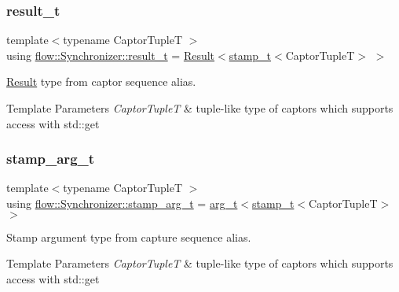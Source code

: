 \subsubsection{\texorpdfstring{result\+\_\+t}{result\_t}}
{\footnotesize\ttfamily template$<$typename Captor\+TupleT $>$ \\
using \hyperlink{classflow_1_1_synchronizer_a4f9693650274ae93f5b9a11cb41a2d80}{flow\+::\+Synchronizer\+::result\+\_\+t} =  \hyperlink{structflow_1_1_result}{Result}$<$\hyperlink{classflow_1_1_synchronizer_a2a443abb40ad2413e6d5f7a7f3cfe4a7}{stamp\+\_\+t}$<$Captor\+TupleT$>$ $>$}



\hyperlink{structflow_1_1_result}{Result} type from captor sequence alias. 


\begin{DoxyTemplParams}{Template Parameters}
{\em Captor\+TupleT} & tuple-\/like type of captors which supports access with {\ttfamily std\+::get} \\
\hline
\end{DoxyTemplParams}
\mbox{\label{classflow_1_1_synchronizer_a0f1e7062475c9492191e29b26d09106c}} 
\subsubsection{\texorpdfstring{stamp\+\_\+arg\+\_\+t}{stamp\_arg\_t}}
{\footnotesize\ttfamily template$<$typename Captor\+TupleT $>$ \\
using \hyperlink{classflow_1_1_synchronizer_a0f1e7062475c9492191e29b26d09106c}{flow\+::\+Synchronizer\+::stamp\+\_\+arg\+\_\+t} =  \hyperlink{classflow_1_1_synchronizer_a70d66cab3e69f69931cbaee6dbd5bdfb}{arg\+\_\+t}$<$\hyperlink{classflow_1_1_synchronizer_a2a443abb40ad2413e6d5f7a7f3cfe4a7}{stamp\+\_\+t}$<$Captor\+TupleT$>$ $>$}



Stamp argument type from capture sequence alias. 


\begin{DoxyTemplParams}{Template Parameters}
{\em Captor\+TupleT} & tuple-\/like type of captors which supports access with {\ttfamily std\+::get} \\
\hline
\end{DoxyTemplParams}
\mbox{\label{classflow_1_1_synchronizer_a2a443abb40ad2413e6d5f7a7f3cfe4a7}} 
